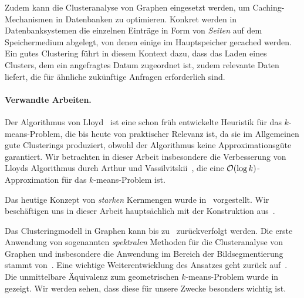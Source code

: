 Zudem kann die Clusteranalyse von Graphen eingesetzt werden, um Caching-Mechanismen in Datenbanken zu optimieren.
Konkret werden in Datenbanksystemen die einzelnen Einträge in Form von \emph{Seiten} auf dem Speichermedium abgelegt,
von denen einige im Hauptspeicher gecached werden. Ein gutes Clustering führt in diesem Kontext dazu, dass das Laden eines
Clusters, dem ein angefragtes Datum zugeordnet ist, zudem relevante Daten liefert, die für ähnliche zukünftige Anfragen
erforderlich sind.

\paragraph{Verwandte Arbeiten.} Der Algorithmus von Lloyd~\cite{Lloyd82} ist eine schon früh entwickelte Heuristik für das
$k$-means-Problem, die bis heute von praktischer Relevanz ist, da sie im Allgemeinen gute Clusterings produziert, obwohl
der Algorithmus keine Approximationsgüte garantiert. Wir betrachten in dieser Arbeit insbesondere die Verbesserung von
Lloyds Algorithmus durch Arthur und Vassilvitskii~\citep{ArthurV07}, die eine $\mathcal{O}(\log k)$-Approximation für das
$k$-means-Problem ist.

Das heutige Konzept von \emph{starken} Kernmengen wurde in~\cite{HarPeledM04} vorgestellt. Wir beschäftigen uns in dieser Arbeit
hauptsächlich mit der Konstruktion aus~\cite{FeldmanSS13,Schmidt14}.

Das Clusteringmodell in Graphen kann bis zu~\cite{KernighanL70} zurückverfolgt werden. Die erste Anwendung von sogenannten
\emph{spektralen} Methoden für die Clusteranalyse von Graphen und insbesondere die Anwendung im Bereich der Bildsegmentierung
stammt von~\cite{ShiM00}. Eine wichtige Weiterentwicklung des Ansatzes geht zurück auf~\cite{NgJW01}. Die unmittelbare
Äquivalenz zum geometrischen $k$-means-Problem wurde in~\cite{DhillonGK04,DhillonGK07} gezeigt. Wir werden sehen, dass diese
für unsere Zwecke besonders wichtig ist.

